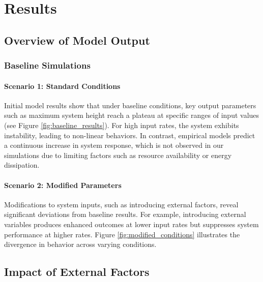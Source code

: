 \chapter{Results}

\fancyfoot[C]{\thepage}

\section{Overview of Model Output}
    \subsection{Baseline Simulations}
        \subsubsection*{Scenario 1: Standard Conditions}
        Initial model results show that under baseline conditions, key output parameters such as maximum system height reach a plateau at specific ranges of input values (see Figure \ref{fig:baseline_results}). For high input rates, the system exhibits instability, leading to non-linear behaviors. In contrast, empirical models predict a continuous increase in system response, which is not observed in our simulations due to limiting factors such as resource availability or energy dissipation.

        \subsubsection*{Scenario 2: Modified Parameters}
        Modifications to system inputs, such as introducing external factors, reveal significant deviations from baseline results. For example, introducing external variables produces enhanced outcomes at lower input rates but suppresses system performance at higher rates. Figure \ref{fig:modified_conditions} illustrates the divergence in behavior across varying conditions.
    

\section{Impact of External Factors}
